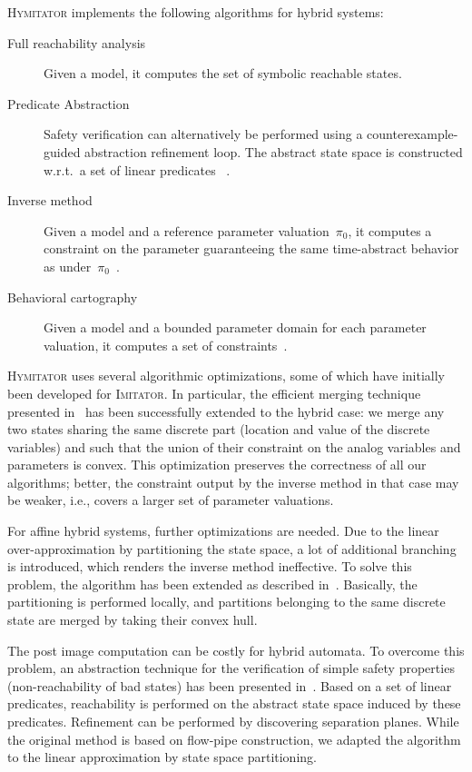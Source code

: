 \documentclass{llncs}
\newcommand{\pio}{\pi_0}
\newcommand{\imitator}{\textsc{Imitator}}
\newcommand{\hymitator}{\textsc{Hymitator}}
\begin{document}
\hymitator{} implements the following algorithms for hybrid systems:
\begin{description}
	\item[Full reachability analysis] Given a model, it computes the set of symbolic reachable states.
\item[Predicate Abstraction] Safety verification can alternatively be performed using a counterexample-guided abstraction refinement loop. The abstract state space is constructed w.r.t.~a set of linear predicates%
	~\cite{ADI2006}.
	\item[Inverse method] Given a model and a reference parameter valuation~$\pio$, it computes a constraint on the parameter guaranteeing the same time-abstract behavior as under~$\pio$~\cite{acef09,FK11}.
	\item[Behavioral cartography] Given a model and a bounded parameter domain for each parameter valuation, it computes a set of constraints~\cite{af10,FK11}.%
\end{description}

\hymitator{} uses several algorithmic optimizations, some of which have initially been developed for \imitator{}.
In particular, the efficient merging technique presented in~\cite{AFS12} has been successfully extended to the hybrid case: we merge any two states sharing the same discrete part (location and value of the discrete variables) and such that the union of their constraint on the analog variables and parameters is convex.
This optimization preserves the correctness of all our algorithms; better, the constraint output by the inverse method in that case may be weaker, i.e., covers a larger set of parameter valuations.

For affine hybrid systems, further optimizations are needed. Due to the linear over-approximation by partitioning the state space, a lot of additional branching is introduced, which renders the inverse method ineffective. To solve this problem, the algorithm has been extended as described in~\cite{FK11}. Basically, the partitioning is performed locally, and partitions belonging to the same discrete state are merged by taking their convex hull. 

The post image computation can be costly for hybrid automata. To overcome this problem, an abstraction technique for the verification of simple safety  properties (non-reachability of bad states) has been presented in~\cite{ADI2006}. Based on a set of linear predicates, reachability is performed on the abstract state space induced by these predicates. Refinement can be performed by discovering separation planes. While the original method is based on flow-pipe construction, we adapted the algorithm to the linear approximation by state space partitioning. 
\end{document}
